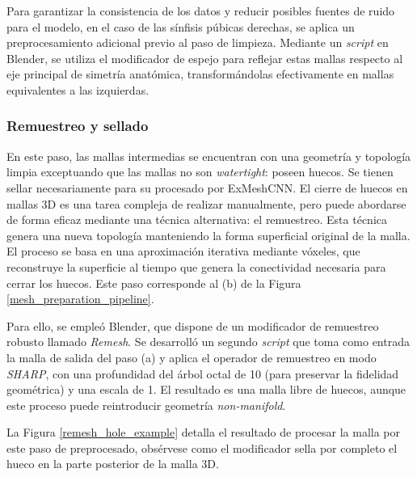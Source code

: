 Para garantizar la consistencia de los datos y reducir posibles fuentes de ruido para el modelo, en el caso de las sínfisis púbicas derechas, se aplica un preprocesamiento adicional previo al paso de limpieza. Mediante un \textit{script} en Blender, se utiliza el modificador de espejo para reflejar estas mallas respecto al eje principal de simetría anatómica, transformándolas efectivamente en mallas equivalentes a las izquierdas.

\subsubsection{Remuestreo y sellado}
En este paso, las mallas intermedias se encuentran con una geometría y topología limpia exceptuando que las mallas no son \textit{watertight}: poseen huecos. Se tienen sellar necesariamente para su procesado por ExMeshCNN. El cierre de huecos en mallas 3D es una tarea compleja de realizar manualmente, pero puede abordarse de forma eficaz mediante una técnica alternativa: el remuestreo. Esta técnica genera una nueva topología manteniendo la forma superficial original de la malla. El proceso se basa en una aproximación iterativa mediante vóxeles, que reconstruye la superficie al tiempo que genera la conectividad necesaria para cerrar los huecos. Este paso corresponde al (b) de la Figura \ref{mesh_preparation_pipeline}.

Para ello, se empleó Blender, que dispone de un modificador de remuestreo robusto llamado \textit{Remesh}. Se desarrolló un segundo \textit{script} que toma como entrada la malla de salida del paso (a) y aplica el operador de remuestreo en modo \textit{SHARP}, con una profundidad del árbol octal de 10 (para preservar la fidelidad geométrica) y una escala de 1. El resultado es una malla libre de huecos, aunque este proceso puede reintroducir geometría \textit{non-manifold}.

La Figura \ref{remesh_hole_example} detalla el resultado de procesar la malla por este paso de preprocesado, obsérvese como el modificador sella por completo el hueco en la parte posterior de la malla 3D.

